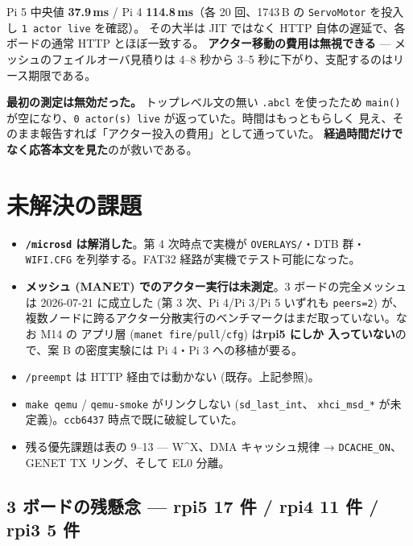 \documentclass[a4paper,11pt]{ltjsarticle}
\begin{document}
Pi 5 中央値 \textbf{37.9\,ms} / Pi 4 \textbf{114.8\,ms}（各 20 回、1743\,B の
\texttt{ServoMotor} を投入し \texttt{1 actor live} を確認）。
その大半は JIT ではなく HTTP 自体の遅延で、各ボードの通常 HTTP とほぼ一致する。
\textbf{アクター移動の費用は無視できる} --- メッシュのフェイルオーバ見積りは
4--8 秒から 3--5 秒に下がり、支配するのはリース期限である。

\textbf{最初の測定は無効だった。} トップレベル文の無い \texttt{.abcl} を使ったため
\texttt{main()} が空になり、\texttt{0 actor(s) live} が返っていた。時間はもっともらしく
見え、そのまま報告すれば「アクター投入の費用」として通っていた。
\textbf{経過時間だけでなく応答本文を見た}のが救いである。

\section{未解決の課題}

\begin{itemize}[leftmargin=1.4em,itemsep=3pt]
\item \textbf{\texttt{/microsd} は解消した}。第 4 次時点で実機が \texttt{OVERLAYS/}・DTB 群・
      \texttt{WIFI.CFG} を列挙する。FAT32 経路が実機でテスト可能になった。
\item \textbf{メッシュ (MANET) でのアクター実行は未測定}。3 ボードの完全メッシュは
      2026-07-21 に成立した (第 3 次、Pi 4/Pi 3/Pi 5 いずれも \texttt{peers=2}) が、
      複数ノードに跨るアクター分散実行のベンチマークはまだ取っていない。なお M14 の
      アプリ層 (\texttt{manet fire}/\texttt{pull}/\texttt{cfg}) は\textbf{rpi5 にしか
      入っていない}ので、案 B の密度実験には Pi 4・Pi 3 への移植が要る。
\item \texttt{/preempt} は HTTP 経由では動かない (既存。上記参照)。
\item \texttt{make qemu} / \texttt{qemu-smoke} がリンクしない (\texttt{sd\_last\_int}、
      \texttt{xhci\_msd\_*} が未定義)。\texttt{ccb6437} 時点で既に破綻していた。
\item 残る優先課題は表の 9--13 --- W\textasciicircum X、DMA キャッシュ規律 →
      \texttt{DCACHE\_ON}、GENET TX リング、そして EL0 分離。
\end{itemize}

\subsection{3 ボードの残懸念 --- rpi5 17 件 / rpi4 11 件 / rpi3 5 件}
\end{document}
